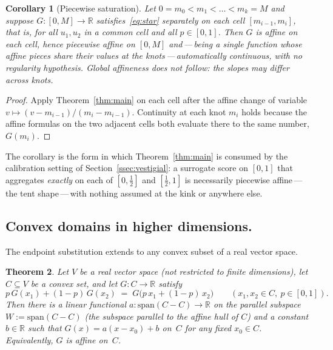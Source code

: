 \documentclass{article}
\theoremstyle{plain}
\newtheorem{theorem}{Theorem}
\newtheorem{corollary}[theorem]{Corollary}
\theoremstyle{definition}
\newcommand{\R}{\mathbb{R}}
\begin{document}
\begin{corollary}[Piecewise saturation]\label{cor:piecewise}
Let $0=m_0<m_1<\dots<m_k=M$ and suppose $G\colon[0,M]\to\R$
satisfies~\eqref{eq:star} separately on each cell $[m_{i-1},m_i]$,
that is, for all $u_1,u_2$ in a common cell and all $p\in[0,1]$. Then
$G$ is affine on each cell, hence piecewise affine on $[0,M]$
and\,---\,being a single function whose affine pieces share their
values at the knots\,---\,automatically continuous, with no
regularity hypothesis. Global affineness does not follow: the slopes
may differ across knots.
\end{corollary}

\begin{proof}
Apply Theorem~\ref{thm:main} on each cell after the affine change of
variable $v\mapsto(v-m_{i-1})/(m_i-m_{i-1})$. Continuity at each knot
$m_i$ holds because the affine formulas on the two adjacent cells both
evaluate there to the same number, $G(m_i)$.
\end{proof}

\noindent The corollary is the form in which Theorem~\ref{thm:main}
is consumed by the calibration setting of
Section~\ref{ssec:vestigial}: a surrogate score on $[0,1]$ that
aggregates \emph{exactly} on each of $[0,\tfrac12]$ and $[\tfrac12,1]$
is necessarily piecewise affine\,---\,the tent shape\,---\,with
nothing assumed at the kink or anywhere else.

\subsection{Convex domains in higher dimensions.}
\label{ssec:higher}

The endpoint substitution extends to any convex subset of a real vector
space.

\begin{theorem}\label{thm:higher}
Let $V$ be a real vector space (not restricted to finite dimensions), let
$C\subseteq V$ be a convex set, and let $G\colon C\to\R$ satisfy
\[
p\,G(x_1)+(1-p)\,G(x_2) \;=\;
G\bigl(p\,x_1+(1-p)\,x_2\bigr) \qquad (x_1,x_2\in C,\ p\in[0,1]).
\]
Then there is a linear functional $a\colon\mathrm{span}(C-C)\to\R$ on the
parallel subspace $W := \mathrm{span}(C-C)$ (the subspace parallel to the
affine hull of $C$) and a constant $b\in\R$ such that $G(x)=a(x-x_0)+b$
on~$C$ for any fixed $x_0\in C$. Equivalently, $G$ is affine on~$C$.
\end{theorem}
\end{document}
